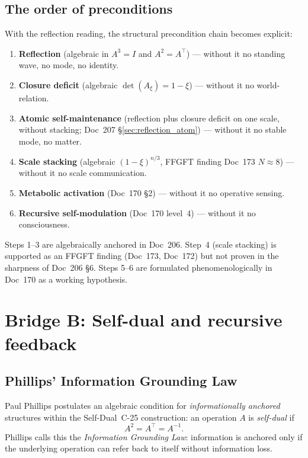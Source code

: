 \subsection{The order of preconditions}\label{sec:reflection_order}

With the reflection reading, the structural precondition chain becomes explicit:

\begin{enumerate}
\item \textbf{Reflection} (algebraic in $A^3 = I$ and $A^2 = A^\top$) --- without it no standing wave, no mode, no identity.
\item \textbf{Closure deficit} (algebraic $\det(A_\xi) = 1-\xi$) --- without it no world-relation.
\item \textbf{Atomic self-maintenance} (reflection plus closure deficit on one scale, without stacking; Doc~207 \S\ref{sec:reflection_atom}) --- without it no stable mode, no matter.
\item \textbf{Scale stacking} (algebraic $(1-\xi)^{n/3}$, FFGFT finding Doc~173 $N \approx 8$) --- without it no scale communication.
\item \textbf{Metabolic activation} (Doc~170 \S2) --- without it no operative sensing.
\item \textbf{Recursive self-modulation} (Doc~170 level~4) --- without it no consciousness.
\end{enumerate}

Steps 1--3 are algebraically anchored in Doc~206. Step~4 (scale stacking) is supported as an FFGFT finding (Doc~173, Doc~172) but not proven in the sharpness of Doc~206 \S6. Steps 5--6 are formulated phenomenologically in Doc~170 as a working hypothesis.

\section{Bridge B: Self-dual and recursive feedback}\label{sec:bridgeB}

\subsection{Phillips' Information Grounding Law}

Paul Phillips postulates an algebraic condition for \emph{informationally anchored} structures within the Self-Dual~C-25 construction: an operation $A$ is \emph{self-dual} if
\begin{equation}
A^2 = A^\top = A^{-1}.
\end{equation}
Phillips calls this the \emph{Information Grounding Law}: information is anchored only if the underlying operation can refer back to itself without information loss.

